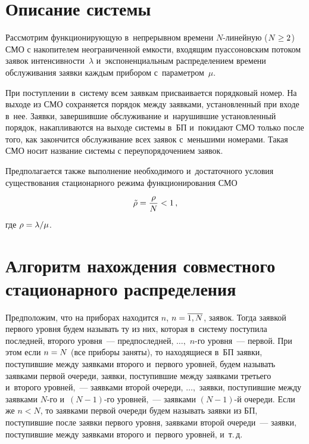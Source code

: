 \begin{multicols}{2}
\section{Описание системы}

Рассмотрим функционирующую в~непрерывном времени
$N$-ли\-ней\-ную ($N\hm\ge 2$) СМО с накопителем
неограниченной емкости, входящим пуассоновским
потоком заявок интенсивности~$\lambda$ \mbox{и~экспоненциальным}
распределением времени
обслуживания заявки каждым прибором с~па\-ра\-мет\-ром~$\mu$.


При поступлении в~систему всем заявкам  присваивается
порядковый номер.
На выходе из СМО сохраняется порядок между заявками,
установленный при входе в~нее.
Заявки, завершившие обслуживание и~нарушившие
установленный порядок, накапливаются на выходе
системы в~БП и~покидают СМО только
после того, как закончится обслуживание всех заявок с~меньшими номерами.
Такая СМО носит название системы с переупорядочением
заявок.

Предполагается также выполнение необходимого и~достаточного условия
существования стационарного режима функционирования СМО
$$\tilde {\rho}\hm=\fr{\rho}{N}<1\,,
$$
 где $\rho\hm=\lambda/\mu$.

\vspace*{-9pt}

\section{Алгоритм нахождения совместного стационарного распределения}

Предположим, что на приборах находится $n$, $n\hm=\overline{1,N}$, заявок.
Тогда заявкой первого уровня будем называть ту из них,
которая в~систему поступила последней, второго уровня~--- предпоследней,
$\ldots,$ $n$-го уровня~--- первой. При этом если $n\hm=N$ (все приборы
заняты), то находящиеся в~БП заявки, поступившие между заявками
второго и~первого уровней, будем называть заявками первой очереди,
заявки, поступившие между заявками третьего и~второго уровней,~---
заявками второй очереди, $\ldots,$ заявки, поступившие между
заявками $N$-го и~$(N-1)$-го уровней,~--- заявками $(N-1)$-й
очереди. Если же $n<N$, то  заявками первой очереди будем называть
заявки из БП, поступившие после заявки первого уровня, заявками
второй очереди~--- заявки, поступившие между заявками второго и~первого уровней,
и~т.\,д.


\end{multicols}
